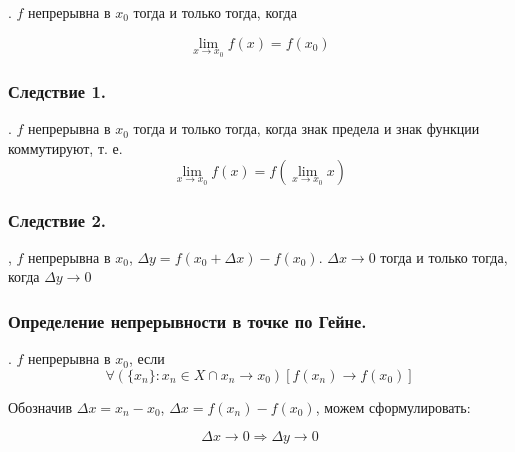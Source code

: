 \fXRx.
$f$ непрерывна в $x_0$ тогда и только тогда, когда 

$$
\lim_{x\to x_0}f(x)=f(x_0)
$$

\subsubsection{Следствие 1.}

\fXRx.
$f$ непрерывна в $x_0$ тогда и только тогда, когда знак предела и знак функции коммутируют, т. е. 
$$
\lim_{x \to x_0} f(x) = f(\lim_{x \to x_0}x)
$$

\subsubsection{Следствие 2.}

\fXRx, $f$ непрерывна в $x_0$, $\Delta y = f(x_0+\Delta x)-f(x_0)$.
$\Delta x \to 0$ тогда и только тогда, когда $\Delta y \to 0$

\subsubsection{Определение непрерывности в точке по Гейне.}

\fXRx.
$f$ непрерывна в $x_0$, если 
$$
\forall(\{x_n\}:x_n \in X \cap x_n \to x_0)[f(x_n)\to f(x_0)]
$$

Обозначив $\Delta x = x_n-x_0$, $\Delta x = f(x_n)-f(x_0)$, можем сформулировать:

$$
\Delta x \to 0 \Rightarrow \Delta y \to 0
$$

